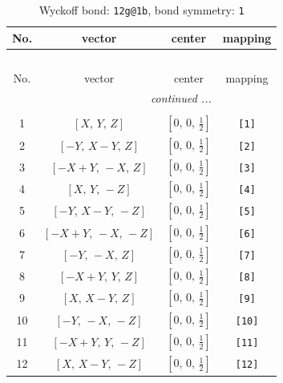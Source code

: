 \documentclass[fleqn,8pt]{jsarticle}
\begin{document}
\begin{longtable}{cccc}
\caption{Wyckoff bond: {\tt 12g@1b}, bond symmetry: {\tt 1}}
 \\
 \hline \hline
No. & vector & center & mapping \\ \hline \endfirsthead

\multicolumn{3}{l}{\tablename\ \thetable{}} \\
 \hline \hline
No. & vector & center & mapping \\ \hline \endhead

 \hline \hline
\multicolumn{3}{r}{\footnotesize\it continued ...} \\ \endfoot

 \hline \hline
\multicolumn{3}{r}{} \\ \endlastfoot

1 & $\left[ X,\, Y,\, Z \right]$ & $\left[ 0,\, 0,\, \frac{1}{2} \right]$ & {\tt [1]} \\ \hline
2 & $\left[ - Y,\, X - Y,\, Z \right]$ & $\left[ 0,\, 0,\, \frac{1}{2} \right]$ & {\tt [2]} \\ \hline
3 & $\left[ - X + Y,\, - X,\, Z \right]$ & $\left[ 0,\, 0,\, \frac{1}{2} \right]$ & {\tt [3]} \\ \hline
4 & $\left[ X,\, Y,\, - Z \right]$ & $\left[ 0,\, 0,\, \frac{1}{2} \right]$ & {\tt [4]} \\ \hline
5 & $\left[ - Y,\, X - Y,\, - Z \right]$ & $\left[ 0,\, 0,\, \frac{1}{2} \right]$ & {\tt [5]} \\ \hline
6 & $\left[ - X + Y,\, - X,\, - Z \right]$ & $\left[ 0,\, 0,\, \frac{1}{2} \right]$ & {\tt [6]} \\ \hline
7 & $\left[ - Y,\, - X,\, Z \right]$ & $\left[ 0,\, 0,\, \frac{1}{2} \right]$ & {\tt [7]} \\ \hline
8 & $\left[ - X + Y,\, Y,\, Z \right]$ & $\left[ 0,\, 0,\, \frac{1}{2} \right]$ & {\tt [8]} \\ \hline
9 & $\left[ X,\, X - Y,\, Z \right]$ & $\left[ 0,\, 0,\, \frac{1}{2} \right]$ & {\tt [9]} \\ \hline
10 & $\left[ - Y,\, - X,\, - Z \right]$ & $\left[ 0,\, 0,\, \frac{1}{2} \right]$ & {\tt [10]} \\ \hline
11 & $\left[ - X + Y,\, Y,\, - Z \right]$ & $\left[ 0,\, 0,\, \frac{1}{2} \right]$ & {\tt [11]} \\ \hline
12 & $\left[ X,\, X - Y,\, - Z \right]$ & $\left[ 0,\, 0,\, \frac{1}{2} \right]$ & {\tt [12]} \\
\end{longtable}
\end{document}
